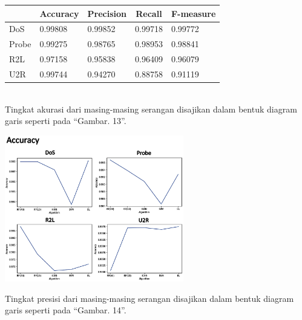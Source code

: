 \documentclass[conference]{IEEEtran}
\begin{document}
\noindent \begin{minipage}{\linewidth}
\begin{center}
\begin{tabular}{|l|l|l|l|l|}
\hline
\multicolumn{1}{|c|}{\textbf{}}&\multicolumn{1}{|c|}{\textbf{Accuracy}}&\multicolumn{1}{|c|}{\textbf{Precision}}&\multicolumn{1}{|c|}{\textbf{Recall}}&\multicolumn{1}{|c|}{\textbf{F-measure}} \\
\hline
DoS & 0.99808 & 0.99852 & 0.99718 & 0.99772\\
\hline
Probe & 0.99275 & 0.98765 & 0.98953 & 0.98841\\
\hline
R2L & 0.97158 & 0.95838 & 0.96409 & 0.96079\\
\hline
U2R & 0.99744 & 0.94270 & 0.88758 & 0.91119\\
\hline
\end{tabular}
\label{tab5}
\end{center}
\end{minipage}\\

\noindent Tingkat akurasi dari masing-masing serangan disajikan dalam bentuk diagram garis seperti pada ``Gambar. 13''.

\noindent \begin{minipage}{\linewidth}
\centerline{\includegraphics[width=78mm]{Gambar/Gbr012.jpg}}
\label{fig13}
\end{minipage}
\vspace{6pt}

\noindent Tingkat presisi dari masing-masing serangan disajikan dalam bentuk diagram garis seperti pada ``Gambar. 14''.\vspace{6pt}
\end{document}
